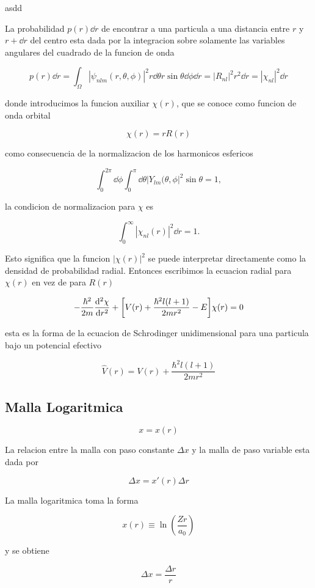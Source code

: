 \documentclass[11pt]{article}
\begin{document}
asdd

La probabilidad \(p(r) \dd{r}\) de encontrar a una particula a una distancia entre \(r\) y \(r + \dd{r}\) del centro esta dada por la integracion sobre solamente las variables angulares del cuadrado de la funcion de onda

\[ p(r) \dd{r} = \int_{\Omega} |\psi_{nlm}(r,\theta,\phi)|^2 r \dd{\theta}r\sin\theta\dd{\phi} \dd{r} = |R_{nl}|^2 r^2 \dd{r} = |\chi_{nl}|^2 \dd{r}  \]

donde introducimos la funcion auxiliar \(\chi(r)\), que se conoce como funcion de onda orbital

\[ \chi(r) = rR(r) \]

como consecuencia de la normalizacion de los harmonicos esfericos

\[ \int_0^{2\pi} \dd{\phi} \int_0^{\pi}\dd{\theta}|Y_{lm}(\theta,\phi|^2 \sin\theta = 1, \]

la condicion de normalizacion para \(\chi\) es

\[ \int_0^{\infty} | \chi_{nl}(r)|^2 \dd{r} = 1. \]

Esto significa que la funcion \(|\chi(r)|^2\) se puede interpretar directamente como la densidad de probabilidad radial. Entonces escribimos la ecuacion radial para \(\chi(r)\) en vez de para \(R(r)\)

\begin{equation}
\label{eq:schr-rad}
- \frac{\hbar^2}{2m}\dv[2]{\chi}{r} + \qty[V(r) + \frac{\hbar^2 l (l+1)}{2mr^2} - E] \chi(r) = 0
\end{equation}

esta es la forma de la ecuacion de Schrodinger unidimensional para una particula bajo un potencial efectivo

\[ \hat{V}(r) = V(r) + \frac{\hbar^2 l(l+1)}{2mr^2} \]
\subsection{Malla Logaritmica}
\label{sec:orgda17906}

\[ x = x(r) \]

La relacion entre la malla con paso constante \(\Delta x\) y la malla de paso variable esta dada por

\[ \Delta x  = x'(r) \Delta r \]

La malla logaritmica toma la forma

\[ x(r) \equiv \ln(\frac{Zr}{a_0}) \]

y se obtiene

\[ \Delta x = \frac{\Delta r}{r} \]
\end{document}
